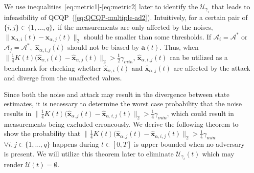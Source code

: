 \documentclass[journal]{IEEEtran}
\begin{document}
We use inequalities~\eqref{eq:metric1}-\eqref{eq:metric2} later to identify the $\mathcal{U}_{\gamma_i}$ that leads to infeasibility of QCQP~(\ref{eq:QCQP-multiple-ad2}).
Intuitively, for a certain pair of $\{i, j\} \in \{1,\ldots,q\},$ if the measurements are only affected by the noises, $\|\mathbf{\hat{x}}_{\alpha,i}(t) - \mathbf{\hat{x}}_{\alpha,j}(t)\|_2$ should be smaller than some thresholds. If $\mathcal{A}_i = \mathcal{A}^{\ast}$ or $\mathcal{A}_j = \mathcal{A}^{\ast},$ $\hat{\mathbf{x}}_{\alpha,i,j}(t)$ should not be biased by $\mathbf{a}(t).$ Thus, when $\|\frac{1}{4}K(t)(\mathbf{\hat{x}}_{\alpha,i}(t) - \mathbf{\hat{x}}_{\alpha,j}(t)\|_2 > \frac{1}{2}\gamma_{min}$, $\hat{\mathbf{x}}_{\alpha,i,j}(t)$ can be utilized as a benchmark for checking whether $\mathbf{\hat{x}}_{\alpha,i}(t)$ and $\mathbf{\hat{x}}_{\alpha,j}(t)$ are affected by the attack and diverge from the unaffected values.

Since both the noise and attack may result in the divergence between state estimates, it is necessary to determine the worst case probability that the noise results in $\|\frac{1}{4}K(t)(\mathbf{\hat{x}}_{\alpha,j}(t) - \mathbf{\hat{x}}_{\alpha,i,j}(t)\|_2 > \frac{1}{4}\gamma_{min}$, which could result in measurements being excluded erroneously. We derive the following theorem to show the probability that $\|\frac{1}{4}K(t)(\mathbf{\hat{x}}_{\alpha,j}(t) - \mathbf{\hat{x}}_{\alpha,i,j}(t)\|_2 > \frac{1}{4}\gamma_{min}$ $\forall i,j \in \{1,\ldots,q\}$ happens during $t \in [0, T]$ is upper-bounded when no adversary is present. We will utilize this theorem later to eliminate $\mathcal{U}_{\gamma_i}(t)$ which may render $\mathcal{U}(t) = \emptyset$.
\end{document}
